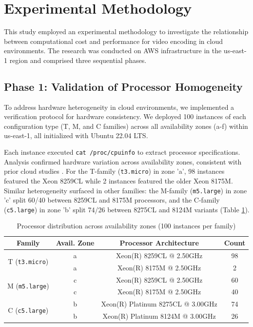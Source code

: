 \documentclass[conference]{IEEEtran}
\begin{document}
	\section{Experimental Methodology}
	\label{met}
	
	This study employed an experimental methodology to investigate the relationship between computational cost and performance for video encoding in cloud environments. The research was conducted on AWS infrastructure in the us-east-1 region and comprised three sequential phases.
	
	\subsection{Phase 1: Validation of Processor Homogeneity}
	\label{met:validation-processor-homogeneity}
	
	To address hardware heterogeneity in cloud environments, we implemented a verification protocol for hardware consistency. We deployed 100 instances of each configuration type (T, M, and C families) across all availability zones (a-f) within us-east-1, all initialized with Ubuntu 22.04 LTS.
	
	Each instance executed \texttt{cat /proc/cpuinfo} to extract processor specifications. Analysis confirmed hardware variation across availability zones, consistent with prior cloud studies \cite{b2, b5, b6, b7}. For the T-family (\texttt{t3.micro}) in zone 'a', 98 instances featured the Xeon 8259CL while 2 instances featured the older Xeon 8175M. Similar heterogeneity surfaced in other families: the M-family (\texttt{m5.large}) in zone 'c' split 60/40 between 8259CL and 8175M processors, and the C-family (\texttt{c5.large}) in zone 'b' split 74/26 between 8275CL and 8124M variants (Table \ref{tab:processors}).
	
	\begin{table}[H]
		\centering
		\caption{Processor distribution across availability zones (100 instances per family)}
		\label{tab:processors}
		\begin{tabular}{|c|c|c|c|}
			\hline
			\textbf{Family} & \textbf{Avail. Zone} & \textbf{Processor Architecture} & \textbf{Count} \\ \hline
			\multirow{2}{*}{T (\texttt{t3.micro})} & a & Xeon(R) 8259CL @ 2.50GHz & 98 \\ \cline{2-4}
			& a & Xeon(R) 8175M @ 2.50GHz & 2 \\ \hline
			\multirow{2}{*}{M (\texttt{m5.large})} & c & Xeon(R) 8259CL @ 2.50GHz & 60 \\ \cline{2-4}
			& c & Xeon(R) 8175M @ 2.50GHz & 40 \\ \hline
			\multirow{2}{*}{C (\texttt{c5.large})} & b & Xeon(R) Platinum 8275CL @ 3.00GHz & 74 \\ \cline{2-4}
			& b & Xeon(R) Platinum 8124M @ 3.00GHz & 26 \\ \hline
		\end{tabular}
	\end{table}
	
\end{document}
